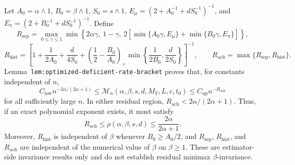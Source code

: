 Let \(A_0=\alpha\wedge1\), \(B_0=\beta\wedge1\), \(S_0=s\wedge1\), \(E_\mu=(2+A_0^{-1}+dS_0^{-1})^{-1}\), and \(E_\pi=(2+B_0^{-1}+dS_0^{-1})^{-1}\). Define
\[
R_{\mathrm{sep}}=\max_{0\le\gamma\le1}\min\left\{2\alpha\gamma,\ 1-\gamma,\ 2\left[\min\{A_0\gamma,E_\mu\}+\min\{B_0\gamma,E_\pi\}\right]\right\},
\]
\[
R_{\mathrm{hist}}=\left[1+\frac{1}{2A_0}+\frac{d}{4S_0}+\left(\frac12-\frac{B_0}{A_0}\right)_+\min\left\{\frac{1}{2B_0},\frac{d}{2S_0}\right\}\right]^{-1},
\qquad R_{\mathrm{ach}}=\max\{R_{\mathrm{sep}},R_{\mathrm{hist}}\}.
\]
Lemma~\texttt{lem:optimized-deficient-rate-bracket} proves that, for constants independent of \(n\),
\[
C_{\mathrm{low}}n^{-2\alpha/(2\alpha+1)}\le\mathcal M_n(\alpha,\beta,s,d,M_Y,L,c,t_0)\le C_{\mathrm{up}}n^{-R_{\mathrm{ach}}}
\]
for all sufficiently large \(n\). In either residual region, \(R_{\mathrm{ach}}<2\alpha/(2\alpha+1)\). Thus, if an exact polynomial exponent exists, it must satisfy
\[
R_{\mathrm{ach}}\le\rho(\alpha,\beta,s,d)\le\frac{2\alpha}{2\alpha+1}.
\]
Moreover, \(R_{\mathrm{hist}}\) is independent of \(\beta\) whenever \(B_0\ge A_0/2\), and \(R_{\mathrm{sep}}\), \(R_{\mathrm{hist}}\), and \(R_{\mathrm{ach}}\) are independent of the numerical value of \(\beta\) on \(\beta\ge1\). These are estimator-side invariance results only and do not establish residual minimax \(\beta\)-invariance.